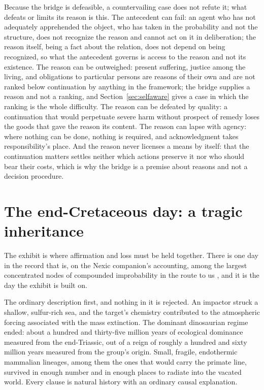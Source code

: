 Because the bridge is defeasible, a countervailing case does not refute it;
what defeats or limits its reason is this. The antecedent can fail: an agent who has not adequately apprehended the object,
who has taken in the probability and not the structure, does not recognize
the reason and cannot act on it in deliberation; the reason itself, being a
fact about the relation, does not depend on being recognized, so what the
antecedent governs is access to the reason and not its existence. The reason
can be outweighed: present suffering, justice among the living, and
obligations to particular persons are reasons of their own and are not ranked
below continuation by anything in the framework; the bridge supplies a reason
and not a ranking, and Section~\ref{sec:selfaware} gives a case in which the
ranking is the whole difficulty. The reason can be defeated by quality: a
continuation that would perpetuate severe harm without prospect of remedy
loses the goods that gave the reason its content. The reason can lapse with
agency: where nothing can be done, nothing is required, and acknowledgment
takes responsibility's place. And the reason never licenses a means by itself:
that the continuation matters settles neither which actions preserve it nor
who should bear their costs, which is why the bridge is a premise about reasons
and not a decision procedure.

\section{The end-Cretaceous day: a tragic inheritance}\label{sec:kpg}

The exhibit is where affirmation and loss must be held together. There is one
day in the record that is, on the Nexic companion's
accounting, among the largest concentrated nodes of compounded improbability
in the route to us \cite{Nexus}, and it is the day the exhibit is built on.

The ordinary description first, and nothing in it is rejected. An impactor
struck a shallow, sulfur-rich sea, and the target's chemistry contributed to
the atmospheric forcing associated with the mass extinction. The dominant
dinosaurian regime ended: about a hundred and thirty-five million years of
ecological dominance measured from the end-Triassic, out of a reign of roughly
a hundred and sixty million years measured from the group's origin. Small,
fragile, endothermic mammalian lineages, among them the ones that would carry
the primate line, survived in enough number and in enough places to radiate
into the vacated world. Every clause is natural history with an ordinary
causal explanation.

